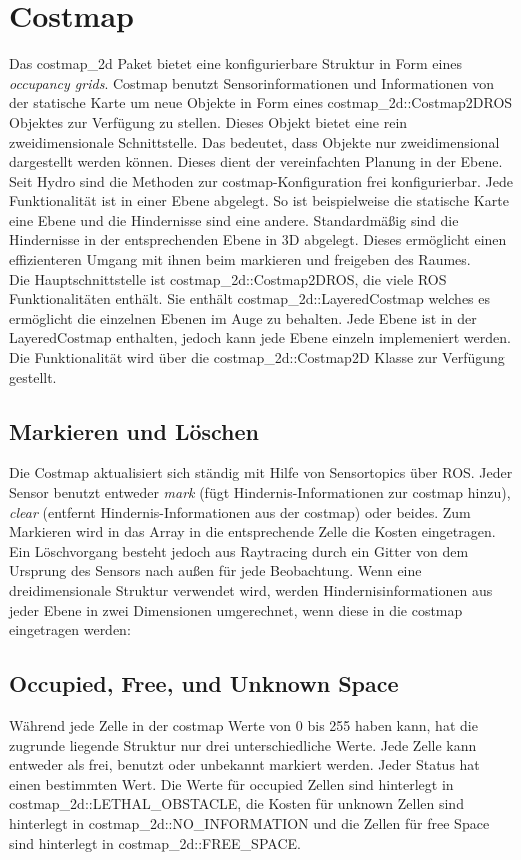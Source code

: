 \documentclass[oribibl]{llncs}
\begin{document}
\section{Costmap} \label{costmap}
Das costmap\_2d Paket \cite{costmap2d} bietet eine konfigurierbare Struktur in Form eines \textit{occupancy grids}. Costmap benutzt Sensorinformationen und Informationen von der statische Karte um neue Objekte in Form eines costmap\_2d::Costmap2DROS Objektes zur Verfügung zu stellen. Dieses Objekt bietet eine rein zweidimensionale Schnittstelle. Das bedeutet, dass Objekte nur zweidimensional dargestellt werden können. Dieses dient der vereinfachten Planung in der Ebene.\\
Seit Hydro sind die Methoden zur costmap-Konfiguration frei konfigurierbar. Jede Funktionalität ist in einer Ebene abgelegt. So ist beispielweise die statische Karte eine Ebene und die Hindernisse sind eine andere. Standardmäßig sind die Hindernisse in der entsprechenden Ebene in 3D abgelegt. Dieses ermöglicht einen effizienteren Umgang mit ihnen beim markieren und freigeben des Raumes.\\
Die Hauptschnittstelle ist costmap\_2d::Costmap2DROS, die viele ROS Funktionalitäten enthält. Sie enthält costmap\_2d::LayeredCostmap welches es ermöglicht die einzelnen Ebenen im Auge zu behalten. Jede Ebene ist in der LayeredCostmap enthalten, jedoch kann jede Ebene einzeln implemeniert werden. Die Funktionalität wird über die costmap\_2d::Costmap2D Klasse zur Verfügung gestellt.
\subsection{Markieren und Löschen}
Die Costmap aktualisiert sich ständig mit Hilfe von Sensortopics über ROS. Jeder Sensor benutzt entweder \textit{mark} (fügt Hindernis-Informationen zur costmap  hinzu), \textit{clear} (entfernt Hindernis-Informationen aus der costmap) oder beides. Zum Markieren wird in das Array in die entsprechende Zelle die Kosten eingetragen. Ein Löschvorgang besteht jedoch aus Raytracing durch ein Gitter von dem Ursprung des Sensors nach außen für jede Beobachtung. Wenn eine dreidimensionale Struktur verwendet wird, werden Hindernisinformationen aus jeder Ebene in zwei Dimensionen umgerechnet, wenn diese in die costmap eingetragen werden:\\
\subsection{Occupied, Free, und Unknown Space}
Während jede Zelle in der costmap Werte von 0 bis 255 haben kann, hat die zugrunde liegende Struktur nur drei unterschiedliche Werte. Jede Zelle kann entweder als frei, benutzt oder unbekannt markiert werden. Jeder Status hat einen bestimmten Wert. Die Werte für occupied Zellen sind hinterlegt in costmap\_2d::LETHAL\_OBSTACLE, die Kosten für unknown Zellen sind hinterlegt in costmap\_2d::NO\_INFORMATION und die Zellen für free Space sind hinterlegt in costmap\_2d::FREE\_SPACE.
\end{document}
